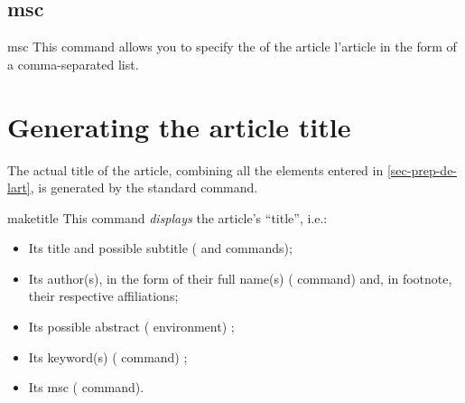 \documentclass[english,nolocaltoc]{nwejmart}
\newtheorem[style=definition]{fact}
\newtheorem[title=experience]{experience}
\newtheorem[title-plural=rings]{ring}
\newtheorem[title=ideal,title-plural=ideals]{ideal}
\begin{document}
\begin{bodycode}[listing options={deletekeywords={[5]keywords}}]
\end{bodycode}

\subsection{\texorpdfstring{\acrfull{msc}}{MSC}}

\begin{docCommand}[doc description=\mandatory]{msc}{}
  This command allows you to specify the  of the article
  l'article in the form of a comma-separated list.
\end{docCommand}

\section{Generating the article title}
\label{sec-creation-du-titre}

The actual title of the article, combining all the elements entered in
\vref{sec-prep-de-lart}, is generated by the standard
 command.

\begin{docCommand}[doc description=\mandatory]{maketitle}{}
  This command  \emph{displays} the article's \enquote{title}, i.e.:
  \begin{itemize}
  \item Its title and possible subtitle ( and
     commands);
  \item Its author(s),  in the form of their full name(s)
    ( command) and, in footnote, their respective affiliations;
  \item Its possible abstract ( environment) ;
  \item Its keyword(s) ( command) ;
  \item Its \acrshort{msc} ( command).
  \end{itemize}
\end{docCommand}
\end{document}
